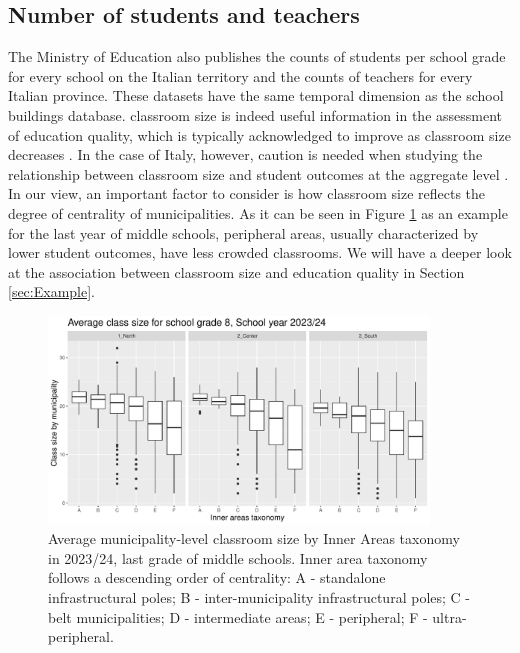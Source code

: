 \documentclass{article}%
\begin{document}
\subsection{Number of students and teachers} \label{par:nstud}
The Ministry of Education also publishes the counts of students per school grade for every school on the Italian territory and the counts of teachers for every Italian province. These datasets have the same temporal dimension as the school buildings database. classroom size is indeed useful information in the assessment of education quality, which is typically acknowledged to improve as classroom size decreases \citep{Blatchford, Bruhwiler}. In the case of Italy, however, caution is needed when studying the relationship between classroom size and student outcomes at the aggregate level \citep{Angrist}. In our view, an important factor to consider is how classroom size reflects the degree of centrality of municipalities. As it can be seen in Figure \ref{fig:nstud_bp_8} as an example for the last year of middle schools, peripheral areas, usually characterized by lower student outcomes, have less crowded classrooms. We will have a deeper look at the association between classroom size and education quality in Section \ref{sec:Example}.
\begin{figure}
  \centering
  \includegraphics[width = 0.9\textwidth]{Fig4.pdf} 
  \caption{Average municipality-level classroom size by Inner Areas taxonomy in 2023/24, last grade of middle schools. Inner area taxonomy follows a descending order of centrality: A - standalone infrastructural poles; B - inter-municipality infrastructural poles; C - belt municipalities; D - intermediate areas; E - peripheral; F - ultra-peripheral.}
  \label{fig:nstud_bp_8}
\end{figure}
\end{document}
